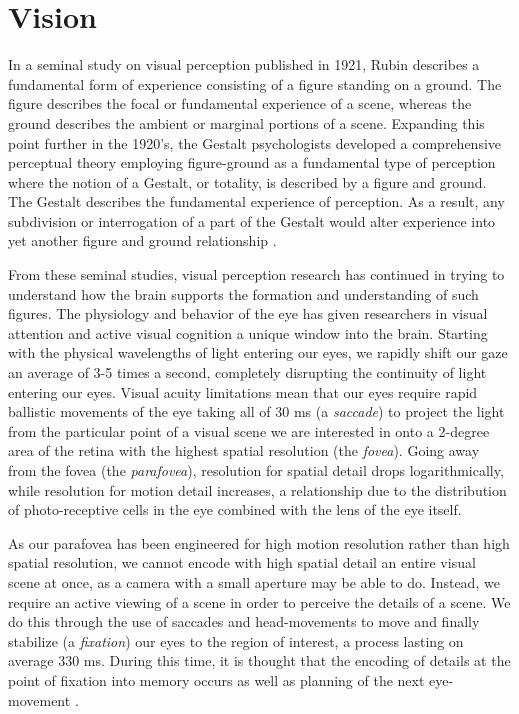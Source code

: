 \section{Vision}

In a seminal study on visual perception published in 1921, Rubin describes a fundamental form of experience consisting of a figure standing on a ground.  The figure describes the focal or fundamental experience of a scene, whereas the ground describes the ambient or marginal portions of a scene.  Expanding this point further in the 1920's, the Gestalt psychologists developed a comprehensive perceptual theory employing figure-ground as a fundamental type of perception where the notion of a Gestalt, or totality, is described by a figure and ground.  The Gestalt describes the fundamental experience of perception.  As a result, any subdivision or interrogation of a part of the Gestalt would alter experience into yet another figure and ground relationship \cite{Wever1927}.  

From these seminal studies, visual perception research has continued in trying to understand how the brain supports the formation and understanding of such figures.  The physiology and behavior of the eye has given researchers in visual attention and active visual cognition a unique window into the brain.  Starting with the physical wavelengths of light entering our eyes, we rapidly shift our gaze an average of 3-5 times a second, completely disrupting the continuity of light entering our eyes.  Visual acuity limitations mean that our eyes require rapid ballistic movements of the eye taking all of 30 ms (a \textit{saccade}) to project the light from the particular point of a visual scene we are interested in onto a 2-degree area of the retina with the highest spatial resolution (the \textit{fovea}).  Going away from the fovea (the \textit{parafovea}), resolution for spatial detail drops logarithmically, while resolution for motion detail increases, a relationship due to the distribution of photo-receptive cells in the eye combined with the lens of the eye itself.  

As our parafovea has been engineered for high motion resolution rather than high spatial resolution, we cannot encode with high spatial detail an entire visual scene at once, as a camera with a small aperture may be able to do.  Instead, we require an active viewing of a scene in order to perceive the details of a scene.  We do this through the use of saccades and head-movements to move and finally stabilize (a \textit{fixation}) our eyes to the region of interest, a process lasting on average 330 ms.  During this time, it is thought that the encoding of details at the point of fixation into memory occurs as well as planning of the next eye-movement \cite{}.  

